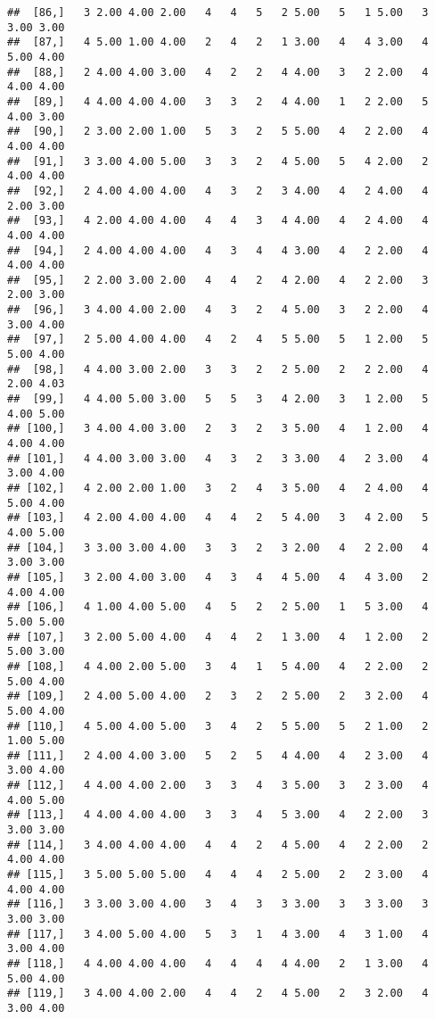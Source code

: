 \documentclass[]{article}
\begin{document}
\begin{verbatim}
##  [86,]   3 2.00 4.00 2.00   4   4   5   2 5.00   5   1 5.00   3 3.00 3.00
##  [87,]   4 5.00 1.00 4.00   2   4   2   1 3.00   4   4 3.00   4 5.00 4.00
##  [88,]   2 4.00 4.00 3.00   4   2   2   4 4.00   3   2 2.00   4 4.00 4.00
##  [89,]   4 4.00 4.00 4.00   3   3   2   4 4.00   1   2 2.00   5 4.00 3.00
##  [90,]   2 3.00 2.00 1.00   5   3   2   5 5.00   4   2 2.00   4 4.00 4.00
##  [91,]   3 3.00 4.00 5.00   3   3   2   4 5.00   5   4 2.00   2 4.00 4.00
##  [92,]   2 4.00 4.00 4.00   4   3   2   3 4.00   4   2 4.00   4 2.00 3.00
##  [93,]   4 2.00 4.00 4.00   4   4   3   4 4.00   4   2 4.00   4 4.00 4.00
##  [94,]   2 4.00 4.00 4.00   4   3   4   4 3.00   4   2 2.00   4 4.00 4.00
##  [95,]   2 2.00 3.00 2.00   4   4   2   4 2.00   4   2 2.00   3 2.00 3.00
##  [96,]   3 4.00 4.00 2.00   4   3   2   4 5.00   3   2 2.00   4 3.00 4.00
##  [97,]   2 5.00 4.00 4.00   4   2   4   5 5.00   5   1 2.00   5 5.00 4.00
##  [98,]   4 4.00 3.00 2.00   3   3   2   2 5.00   2   2 2.00   4 2.00 4.03
##  [99,]   4 4.00 5.00 3.00   5   5   3   4 2.00   3   1 2.00   5 4.00 5.00
## [100,]   3 4.00 4.00 3.00   2   3   2   3 5.00   4   1 2.00   4 4.00 4.00
## [101,]   4 4.00 3.00 3.00   4   3   2   3 3.00   4   2 3.00   4 3.00 4.00
## [102,]   4 2.00 2.00 1.00   3   2   4   3 5.00   4   2 4.00   4 5.00 4.00
## [103,]   4 2.00 4.00 4.00   4   4   2   5 4.00   3   4 2.00   5 4.00 5.00
## [104,]   3 3.00 3.00 4.00   3   3   2   3 2.00   4   2 2.00   4 3.00 3.00
## [105,]   3 2.00 4.00 3.00   4   3   4   4 5.00   4   4 3.00   2 4.00 4.00
## [106,]   4 1.00 4.00 5.00   4   5   2   2 5.00   1   5 3.00   4 5.00 5.00
## [107,]   3 2.00 5.00 4.00   4   4   2   1 3.00   4   1 2.00   2 5.00 3.00
## [108,]   4 4.00 2.00 5.00   3   4   1   5 4.00   4   2 2.00   2 5.00 4.00
## [109,]   2 4.00 5.00 4.00   2   3   2   2 5.00   2   3 2.00   4 5.00 4.00
## [110,]   4 5.00 4.00 5.00   3   4   2   5 5.00   5   2 1.00   2 1.00 5.00
## [111,]   2 4.00 4.00 3.00   5   2   5   4 4.00   4   2 3.00   4 3.00 4.00
## [112,]   4 4.00 4.00 2.00   3   3   4   3 5.00   3   2 3.00   4 4.00 5.00
## [113,]   4 4.00 4.00 4.00   3   3   4   5 3.00   4   2 2.00   3 3.00 3.00
## [114,]   3 4.00 4.00 4.00   4   4   2   4 5.00   4   2 2.00   2 4.00 4.00
## [115,]   3 5.00 5.00 5.00   4   4   4   2 5.00   2   2 3.00   4 4.00 4.00
## [116,]   3 3.00 3.00 4.00   3   4   3   3 3.00   3   3 3.00   3 3.00 3.00
## [117,]   3 4.00 5.00 4.00   5   3   1   4 3.00   4   3 1.00   4 3.00 4.00
## [118,]   4 4.00 4.00 4.00   4   4   4   4 4.00   2   1 3.00   4 5.00 4.00
## [119,]   3 4.00 4.00 2.00   4   4   2   4 5.00   2   3 2.00   4 3.00 4.00

\end{verbatim}
\end{document}

